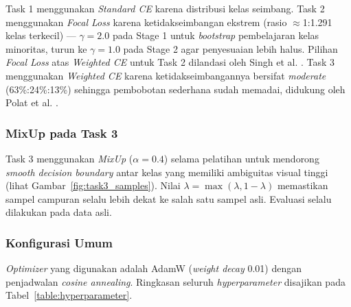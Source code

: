 Task 1 menggunakan \textit{Standard CE} karena distribusi kelas
seimbang. Task 2 menggunakan \textit{Focal Loss} karena ketidakseimbangan
ekstrem (rasio $\approx$1:1.291 kelas terkecil) — $\gamma=2.0$ pada
Stage 1 untuk \textit{bootstrap} pembelajaran kelas minoritas, turun ke
$\gamma=1.0$ pada Stage 2 agar penyesuaian lebih halus. Pilihan
\textit{Focal Loss} atas \textit{Weighted CE} untuk Task 2 dilandasi
oleh Singh et al. \cite{singh2023bbfl}. Task 3 menggunakan
\textit{Weighted CE} karena ketidakseimbangannya bersifat
\textit{moderate} (63\%:24\%:13\%) sehingga pembobotan sederhana sudah
memadai, didukung oleh Polat et al. \cite{polat2025cdwce}. \par

\subsubsection{MixUp pada Task 3}
Task 3 menggunakan \textit{MixUp} ($\alpha=0.4$) selama pelatihan untuk
mendorong \textit{smooth decision boundary} antar kelas yang memiliki
ambiguitas visual tinggi (lihat Gambar~\ref{fig:task3_samples}). Nilai
$\lambda = \max(\lambda, 1-\lambda)$ memastikan sampel campuran selalu
lebih dekat ke salah satu sampel asli. Evaluasi selalu dilakukan pada
data asli. \par

\subsubsection{Konfigurasi Umum}
\textit{Optimizer} yang digunakan adalah AdamW (\textit{weight decay}
0.01) dengan penjadwalan \textit{cosine annealing}. Ringkasan seluruh
\textit{hyperparameter} disajikan pada
Tabel~\ref{table:hyperparameter}. \par

